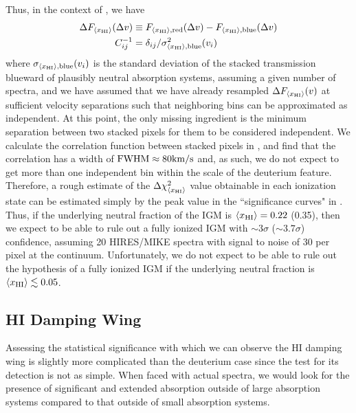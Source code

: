  
Thus, in the context of , we have 
\begin{align}
\Delta F_{\langle x_{\text{HI}}\rangle}(\Delta v) &\equiv F_{\langle x_{\text{HI}}\rangle,\text{red}}(\Delta v) - F_{\langle x_{\text{HI}}\rangle,\text{blue}}(\Delta v) \\
C^{-1}_{ij} &= \delta_{ij} /\sigma^2_{\langle x_{\text{HI}}\rangle,\text{blue}}(v_i)
\end{align}
where $\sigma_{\langle x_{\text{HI}}\rangle,\text{blue}}(v_i)$ is the standard deviation of the stacked transmission blueward of plausibly neutral absorption systems, assuming a given number of spectra, and we have assumed that we have already resampled $\Delta F_{\langle x_{\text{HI}}\rangle}(v)$ at sufficient velocity separations such that neighboring bins can be approximated as independent. At this point, the only missing ingredient is the minimum separation between two stacked pixels for them to be considered independent. We calculate the correlation function between stacked pixels in \lyb, and find that the correlation has a width of $\text{FWHM} \approx 80\text{km}/\text{s}$ and, as such, we do not expect to get more than one independent bin within the scale of the deuterium feature. Therefore, a rough estimate of the $\Delta \chi^2_{\langle x_{\text{HI}}\rangle}$ value obtainable in each ionization state can be estimated simply by the peak value in the ``significance curves" in . Thus, if the underlying neutral fraction of the IGM is $\langle x_{\text{HI}}\rangle = 0.22$ (0.35), then we expect to be able to rule out a fully ionized IGM with $\sim3\sigma$ ($\sim 3.7 \sigma$) confidence, assuming 20 HIRES/MIKE spectra with signal to noise of 30 per pixel at the continuum. Unfortunately, we do not expect to be able to rule out the hypothesis of a fully ionized IGM if the underlying neutral fraction is $\langle x_{\text{HI}}\rangle \lesssim 0.05$.



\subsection{HI Damping Wing} \label{sec:NeutralIslandsHIForecast}

 
 Assessing the statistical significance with which we can observe the HI damping wing is slightly more complicated than the deuterium case since the test for its detection is not as simple. When faced with actual spectra, we would look for the presence of significant and extended absorption outside of large absorption systems compared to that outside of small absorption systems. 


